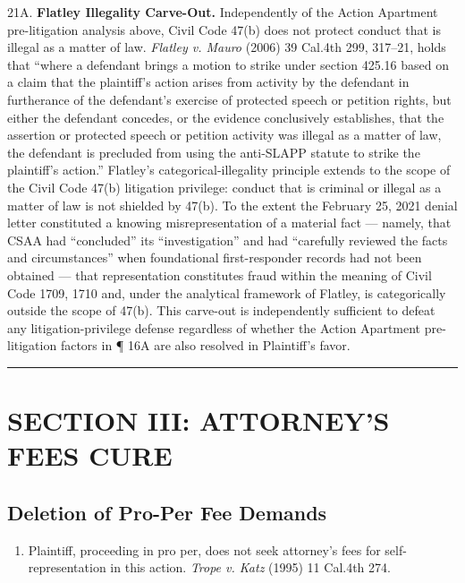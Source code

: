 21A. \textbf{Flatley Illegality Carve-Out.} Independently of the Action Apartment pre-litigation analysis above, Civil Code \textsection{} 47(b) does not protect conduct that is illegal as a matter of law. \emph{Flatley v. Mauro} (2006) 39 Cal.4th 299, 317--21, holds that ``where a defendant brings a motion to strike under section 425.16 based on a claim that the plaintiff's action arises from activity by the defendant in furtherance of the defendant's exercise of protected speech or petition rights, but either the defendant concedes, or the evidence conclusively establishes, that the assertion or protected speech or petition activity was illegal as a matter of law, the defendant is precluded from using the anti-SLAPP statute to strike the plaintiff's action.'' Flatley's categorical-illegality principle extends to the scope of the Civil Code \textsection{} 47(b) litigation privilege: conduct that is criminal or illegal as a matter of law is not shielded by \textsection{} 47(b). To the extent the February 25, 2021 denial letter constituted a knowing misrepresentation of a material fact --- namely, that CSAA had ``concluded'' its ``investigation'' and had ``carefully reviewed the facts and circumstances'' when foundational first-responder records had not been obtained --- that representation constitutes fraud within the meaning of Civil Code \textsection{}\textsection{} 1709, 1710 and, under the analytical framework of Flatley, is categorically outside the scope of \textsection{} 47(b). This carve-out is independently sufficient to defeat any litigation-privilege defense regardless of whether the Action Apartment pre-litigation factors in ¶ 16A are also resolved in Plaintiff's favor.

\begin{center}\rule{0.5\linewidth}{0.5pt}\end{center}

\label{toc:section-iii-attorneys-fees-cure}
\section{SECTION III: ATTORNEY'S FEES CURE}\label{section-iii-attorneys-fees-cure}

\subsection{Deletion of Pro-Per Fee Demands}\label{deletion-of-pro-per-fee-demands}

\begin{enumerate}
\def\labelenumi{\arabic{enumi}.}
\setcounter{enumi}{21}
\tightlist
\item
  Plaintiff, proceeding in pro per, does not seek attorney's fees for self-representation in this action. \emph{Trope v. Katz} (1995) 11 Cal.4th 274.
\end{enumerate}


